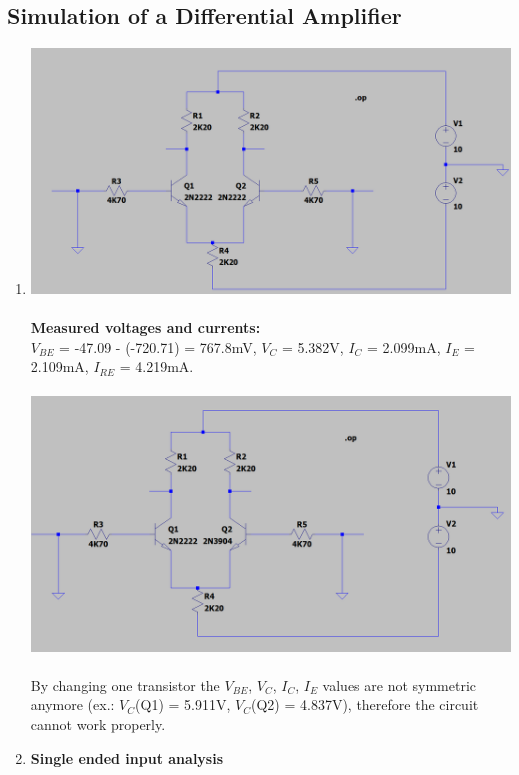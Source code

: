 \documentclass{article}
\begin{document}
	\subsection{Simulation of a Differential Amplifier}
	\begin{enumerate}
		\item \includegraphics[scale=0.4]{prelab 4/circuit 1 - no input}\\\\
		\textbf{Measured voltages and currents:}\\
		\(V_{BE}\) = -47.09 - (-720.71) = 767.8mV,  \(V_C\) = 5.382V, \(I_C\) = 2.099mA, \(I_E\) = 2.109mA, \(I_{RE}\) = 4.219mA.\\\\
		\includegraphics[scale=0.4]{prelab 4/circuit 1 - tr changed}\\\\
		By changing one transistor the \(V_{BE}\), \(V_C\), \(I_C\), \(I_E\) values are not symmetric anymore (ex.: \(V_C\)(Q1) = 5.911V, \(V_C\)(Q2) = 4.837V), therefore the circuit cannot work properly.
		\item \textbf{Single ended input analysis}\\\\

\end{enumerate}
\end{document}
